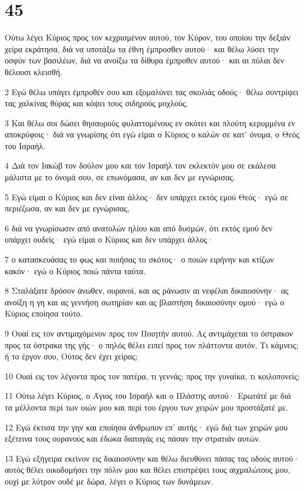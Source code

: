 \chapter{45}

\par Ούτω λέγει Κύριος προς τον κεχρισμένον αυτού, τον Κύρον, του οποίου την δεξιάν χείρα εκράτησα, διά να υποτάξω τα έθνη έμπροσθεν αυτού· και θέλω λύσει την οσφύν των βασιλέων, διά να ανοίξω τα δίθυρα έμπροθεν αυτού· και αι πύλαι δεν θέλουσι κλεισθή.
\par 2 Εγώ θέλω υπάγει έμπροθέν σου και εξομαλύνει τας σκολιάς οδούς· θέλω συντρίψει τας χαλκίνας θύρας και κόψει τους σιδηρούς μοχλούς.
\par 3 Και θέλω σοι δώσει θησαυρούς φυλαττομένους εν σκότει και πλούτη κερυμμένα εν αποκρύφοις· διά να γνωρίσης ότι εγώ είμαι ο Κύριος ο καλών σε κατ' όνομα, ο Θεός του Ισραήλ.
\par 4 Διά τον Ιακώβ τον δούλον μου και τον Ισραήλ τον εκλεκτόν μου σε εκάλεσα μάλιστα με το όνομά σου, σε επωνόμασα, αν και δεν με εγνώρισας.
\par 5 Εγώ είμαι ο Κύριος και δεν είναι άλλος· δεν υπάρχει εκτός εμού Θεός· εγώ σε περιέζωσα, αν και δεν με εγνώρισας,
\par 6 διά να γνωρίσωσιν από ανατολών ηλίου και από δυσμών, ότι εκτός εμού δεν υπάρχει ουδείς· εγώ είμαι ο Κύριος και δεν υπάρχει άλλος·
\par 7 ο κατασκευάσας το φως και ποιήσας το σκότος· ο ποιών ειρήνην και κτίζων κακόν· εγώ ο Κύριος ποιώ πάντα ταύτα.
\par 8 Σταλάξατε δρόσον άνωθεν, ουρανοί, και ας ράνωσιν αι νεφέλαι δικαιοσύνην· ας ανοίξη η γη και ας γεννήση σωτηρίαν και ας βλαστήση δικαιοσύνην ομού· εγώ ο Κύριος εποίησα τούτο.
\par 9 Ουαί εις τον αντιμαχόμενον προς τον Ποιητήν αυτού. Ας αντιμάχεται το όστρακον προς τα όστρακα της γής· ο πηλός θέλει ειπεί προς τον πλάττοντα αυτόν, Τι κάμνεις; ή το έργον σου, Ούτος δεν έχει χείρας;
\par 10 Ουαί εις τον λέγοντα προς τον πατέρα, τι γεννάς; προς την γυναίκα, τι κοιλοπονείς;
\par 11 Ούτω λέγει Κύριος, ο Άγιος του Ισραήλ και ο Πλάστης αυτού· Ερωτάτέ με διά τα μέλλοντα περί των υιών μου και περί του έργου των χειρών μου προστάξατέ με.
\par 12 Εγώ έκτισα την γην και εποίησα άνθρωπον επ' αυτής· εγώ διά των χειρών μου εξέτεινα τους ουρανούς και έδωκα διαταγάς εις πάσαν την στρατιάν αυτών.
\par 13 Εγώ εξήγειρα εκείνον εις δικαιοσύνην και θέλω διευθύνει πάσας τας οδούς αυτού· αυτός θέλει οικοδομήσει την πόλιν μου και θέλει επιστρέψει τους αιχμαλώτους μου, ουχί με λύτρον ουδέ με δώρα, λέγει ο Κύριος των δυνάμεων.
